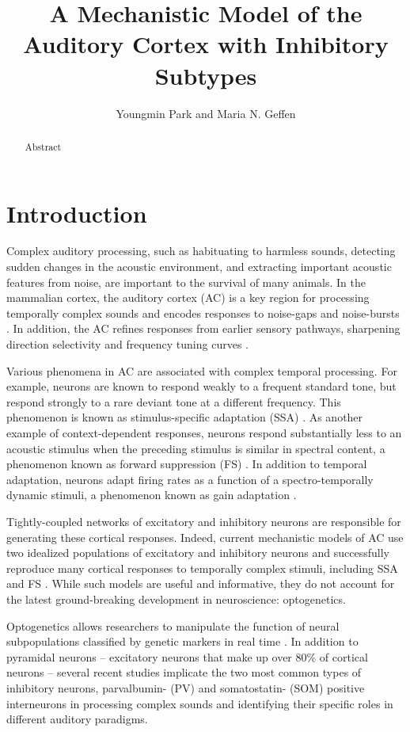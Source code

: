 \documentclass[a4paper,10pt]{article}
\title{A Mechanistic Model of the Auditory Cortex with Inhibitory Subtypes}
\author{Youngmin Park and Maria N. Geffen}
\begin{document}
 

\maketitle
\begin{abstract}
Abstract 
\end{abstract}
 
\section{Introduction}

Complex auditory processing, such as habituating to harmless sounds, detecting sudden changes in the acoustic environment, and extracting important acoustic features from noise, are important to the survival of many animals. In the mammalian cortex, the auditory cortex (AC) is a key region for processing temporally complex sounds \cite{} and encodes responses to noise-gaps and noise-bursts \cite{}. In addition, the AC refines responses from earlier sensory pathways, sharpening direction selectivity \cite{} and frequency tuning curves \cite{}.

Various phenomena in AC are associated with complex temporal processing. For example, neurons are known to respond weakly to a frequent standard tone, but respond strongly to a rare deviant tone at a different frequency. This phenomenon is known as stimulus-specific adaptation (SSA) \cite{}. As another example of context-dependent responses, neurons respond substantially less to an acoustic stimulus when the preceding stimulus is similar in spectral content, a phenomenon known as forward suppression (FS) \cite{}. In addition to temporal adaptation, neurons adapt firing rates as a function of a spectro-temporally dynamic stimuli, a phenomenon known as gain adaptation \cite{}.

Tightly-coupled networks of excitatory and inhibitory neurons are responsible for generating these cortical responses. Indeed, current mechanistic models of AC use two idealized populations of excitatory and inhibitory neurons and successfully reproduce many cortical responses to temporally complex stimuli, including SSA \cite{mill2011neurocomputational,nelken2014stimulus,yarden2017stimulus} and FS \cite{loebel2007processing}. While such models are useful and informative, they do not account for the latest ground-breaking development in neuroscience: optogenetics.

Optogenetics allows researchers to manipulate the function of neural subpopulations classified by genetic markers \cite{markram2004interneurons,li2014differential} in real time \cite{deisseroth2006next}. In addition to pyramidal neurons -- excitatory neurons that make up over 80\% of cortical neurons \cite{} -- several recent studies implicate the two most common types of inhibitory neurons, parvalbumin- (PV) and somatostatin- (SOM) positive interneurons in processing complex sounds and identifying their specific roles in different auditory paradigms.
\end{document}
